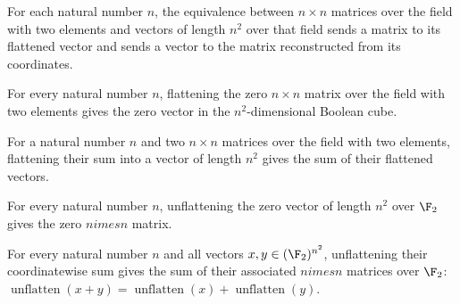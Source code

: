 \begin{definition}
\label{FABL.binaryMatrixCubeEquiv}
\leanok
{}
For each natural number $n$, the equivalence between $n\times n$ matrices over the field
with two elements and vectors of length $n^2$ over that field sends a matrix to its
flattened vector and sends a vector to the matrix reconstructed from its coordinates.
\end{definition}

\begin{theorem}
\label{FABL.flattenBinaryMatrix_zero}
\leanok
{}
For every natural number $n$, flattening the zero $n\times n$ matrix over the field with
two elements gives the zero vector in the $n^2$-dimensional Boolean cube.
\end{theorem}

\begin{theorem}
\label{FABL.flattenBinaryMatrix_add}
\leanok
{}
For a natural number $n$ and two $n\times n$ matrices over the field with two elements,
flattening their sum into a vector of length $n^2$ gives the sum of their flattened
vectors.
\end{theorem}

\begin{theorem}
\label{FABL.unflattenBinaryMatrix_zero}
\leanok
{}
For every natural number $n$, unflattening the zero vector of length $n^2$ over $\F_2$
gives the zero $n 	imes n$ matrix.
\end{theorem}

\begin{theorem}
\label{FABL.unflattenBinaryMatrix_add}
\leanok
{}
For every natural number $n$ and all vectors $x,y \in (\F_2)^{n^2}$, unflattening their
coordinatewise sum gives the sum of their associated $n 	imes n$ matrices over $\F_2$:
$\operatorname{unflatten}(x+y)=\operatorname{unflatten}(x)+\operatorname{unflatten}(y)$.
\end{theorem}

